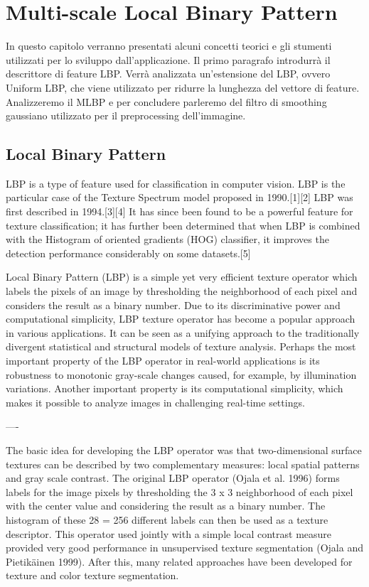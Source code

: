 \section{Multi-scale Local Binary Pattern}
In questo capitolo verranno presentati alcuni concetti teorici e gli stumenti utilizzati per lo sviluppo dall'applicazione. Il primo paragrafo introdurrà il descrittore di feature \acf{LBP}. Verrà analizzata un'estensione del \acs{LBP}, ovvero Uniform \acs{LBP}, che viene utilizzato per ridurre la lunghezza del vettore di feature. Analizzeremo il \acf{MLBP} e per concludere parleremo del filtro di smoothing gaussiano utilizzato per il preprocessing dell'immagine.

\subsection{Local Binary Pattern}

\acf{LBP} is a type of feature used for classification in computer vision. LBP is the particular case of the Texture Spectrum model proposed in 1990.[1][2] LBP was first described in 1994.[3][4] It has since been found to be a powerful feature for texture classification; it has further been determined that when LBP is combined with the Histogram of oriented gradients (HOG) classifier, it improves the detection performance considerably on some datasets.[5]

Local Binary Pattern (LBP) is a simple yet very efficient texture operator which labels the pixels of an image by thresholding the neighborhood of each pixel and considers the result as a binary number. Due to its discriminative power and computational simplicity, LBP texture operator has become a popular approach in various applications. It can be seen as a unifying approach to the traditionally divergent statistical and structural models of texture analysis. Perhaps the most important property of the LBP operator in real-world applications is its robustness to monotonic gray-scale changes caused, for example, by illumination variations. Another important property is its computational simplicity, which makes it possible to analyze images in challenging real-time settings. 


----

The basic idea for developing the LBP operator was that two-dimensional surface textures can be described by two complementary measures: local spatial patterns and gray scale contrast. The original LBP operator (Ojala et al. 1996) forms labels for the image pixels by thresholding the 3 x 3 neighborhood of each pixel with the center value and considering the result as a binary number. The histogram of these 28 = 256 different labels can then be used as a texture descriptor. This operator used jointly with a simple local contrast measure provided very good performance in unsupervised texture segmentation (Ojala and Pietikäinen 1999). After this, many related approaches have been developed for texture and color texture segmentation.

